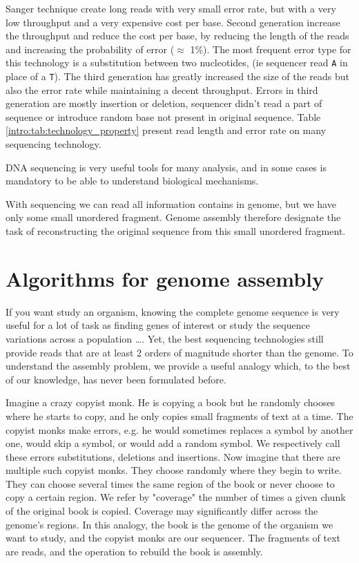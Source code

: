 \documentclass[./main.tex]{subfiles}
\begin{document}
Sanger technique create long reads with very small error rate, but with a very low throughput and a very expensive cost per base. %
Second generation increase the throughput and reduce the cost per base, by reducing the length of the reads and increasing the probability of error ($\approx$ 1\%).%
The most frequent error type for this technology is a substitution between two nucleotides, (ie sequencer read \texttt{A} in place of a \texttt{T}).%
The third generation has greatly increased the size of the reads but also the error rate while maintaining a decent throughput. %
Errors in third generation are mostly insertion or deletion, sequencer didn't read a part of sequence or introduce random base not present in original sequence. Table \ref{intro:tab:technology_property} present read length and error rate on many sequencing technology.%

DNA sequencing is very useful tools for many analysis, and in some cases is mandatory to be able to understand biological mechanisms. %

With sequencing we can read all information contains in genome, but we have only some small unordered fragment. Genome assembly therefore designate the task of reconstructing the original sequence from this small unordered fragment.%

\section{Algorithms for genome assembly}

If you want study an organism, knowing the complete genome sequence is very useful for a lot of task as finding 
genes of interest or study the sequence variations across a population \ldots.%
Yet, the best sequencing technologies still provide reads that are at least 2 orders of magnitude shorter than the genome. To understand the assembly problem, we provide a useful analogy which, to the best of our knowledge, has never been formulated before.

Imagine a crazy copyist monk. He is copying a book but he randomly chooses where he starts to copy, and he only copies small fragments of text at a time.
The copyist monks make errors, e.g. he would sometimes replaces a symbol by another one, would skip a symbol, or would add a random symbol. We respectively call these errors substitutions, deletions and insertions.
Now imagine that there are multiple such copyist monks.
They choose randomly where they begin to write. They can choose several times the same region of the book or never choose to copy a certain region.
We refer by "coverage" the number of times a given chunk of the original book is copied. Coverage may significantly differ across the genome's regions.%
In this analogy, the book is the genome of the organism we want to study, and the copyist monks are our sequencer. The fragments of text are reads, and the operation to rebuild the book is assembly.
\end{document}
